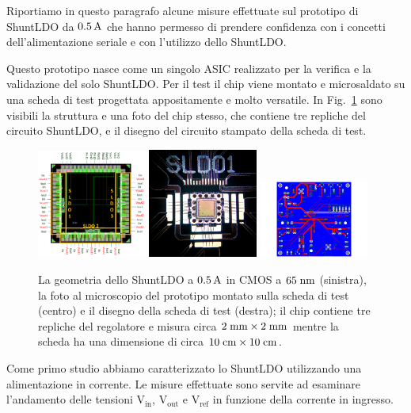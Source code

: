Riportiamo in questo paragrafo alcune misure effettuate sul prototipo di ShuntLDO da $0.5\rm \, A$ che hanno permesso di prendere confidenza con i concetti dell'alimentazione seriale e con l'utilizzo dello ShuntLDO.

Questo prototipo nasce come un singolo ASIC realizzato per la verifica e la validazione del solo ShuntLDO. Per il test il chip viene montato e microsaldato su una scheda di test progettata appositamente e molto versatile. In Fig.~\ref{PCB05A} sono visibili la struttura e una foto del chip stesso, che contiene tre repliche del circuito ShuntLDO, e il disegno del circuito stampato della scheda di test.
\begin{figure}
\centering
\includegraphics[width=0.32\textwidth]{Immagini/chipSLDO05A.png}
\hfill
\includegraphics[width=0.32\textwidth]{Immagini/chip05_foto.png}
\hfill
\includegraphics[width=0.32\textwidth]{Immagini/pcb05.pdf}
\caption{La geometria dello ShuntLDO a $0.5\rm \, A$ in CMOS a $65\rm \; nm$ (sinistra), la foto al microscopio del prototipo montato sulla scheda di test (centro) e il disegno della scheda di test (destra); il chip contiene tre repliche del regolatore e misura circa $2\rm \; mm\times 2\rm \; mm$ mentre la scheda ha una dimensione di circa $10\rm \; cm \times 10\rm \; cm$.}
\label{PCB05A}
\end{figure}
Come primo studio abbiamo caratterizzato lo ShuntLDO utilizzando una alimentazione in corrente. Le misure effettuate sono servite ad esaminare l'andamento delle tensioni $\mathrm{V_{in}}$, $\mathrm{V_{out}}$ e $\mathrm{V_{ref}}$ in funzione della corrente in ingresso.

